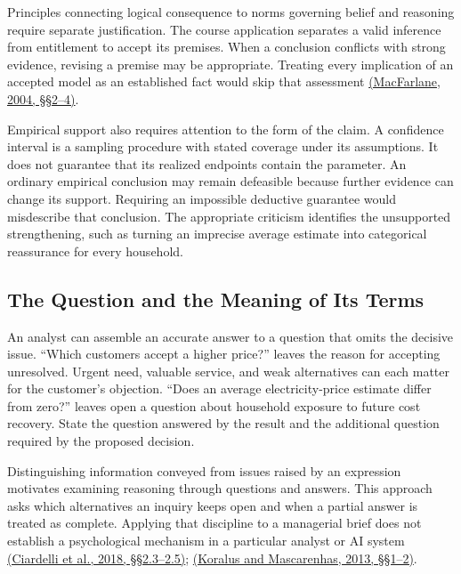 Principles connecting logical consequence to norms governing belief and
reasoning require separate justification. The course application
separates a valid inference from entitlement to accept its premises.
When a conclusion conflicts with strong evidence, revising a premise may
be appropriate. Treating every implication of an accepted model as an
established fact would skip that assessment
\href{https://johnmacfarlane.net/normativity_of_logic.pdf}{(MacFarlane,
2004, §§2--4)}.

Empirical support also requires attention to the form of the claim. A
confidence interval is a sampling procedure with stated coverage under
its assumptions. It does not guarantee that its realized endpoints
contain the parameter. An ordinary empirical conclusion may remain
defeasible because further evidence can change its support. Requiring an
impossible deductive guarantee would misdescribe that conclusion. The
appropriate criticism identifies the unsupported strengthening, such as
turning an imprecise average estimate into categorical reassurance for
every household.

\hypertarget{M09-the-question-and-the-meaning-of-its-terms}{%
\subsection{The Question and the Meaning of Its
Terms}\label{M09-the-question-and-the-meaning-of-its-terms}}

\noindent \noindent An analyst can assemble an accurate answer to a question that
omits the decisive issue. ``Which customers accept a higher price?''
leaves the reason for accepting unresolved. Urgent need, valuable
service, and weak alternatives can each matter for the customer's
objection. ``Does an average electricity-price estimate differ from
zero?'' leaves open a question about household exposure to future cost
recovery. State the question answered by the result and the additional
question required by the proposed decision.

Distinguishing information conveyed from issues raised by an expression
motivates examining reasoning through questions and answers. This
approach asks which alternatives an inquiry keeps open and when a
partial answer is treated as complete. Applying that discipline to a
managerial brief does not establish a psychological mechanism in a
particular analyst or AI system
\href{https://fdslive.oup.com/www.oup.com/academic/pdf/openaccess/9780198814788.pdf}{(Ciardelli
et al., 2018, §§2.3--2.5)};
\href{https://doi.org/10.1111/phpe.12029}{(Koralus and Mascarenhas,
2013, §§1--2)}.


